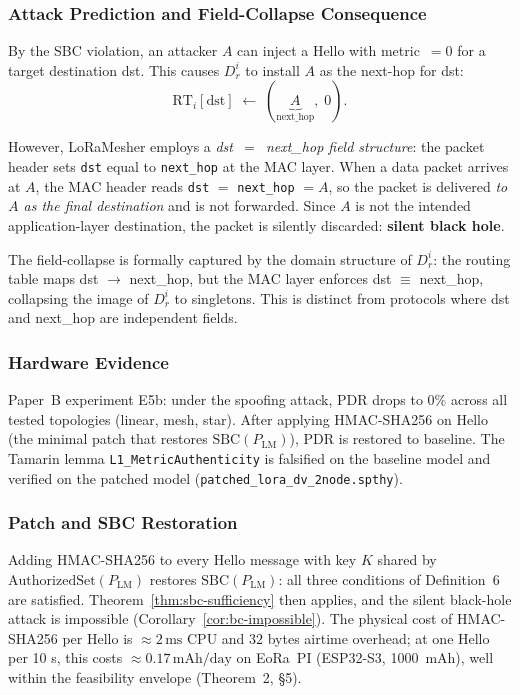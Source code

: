 \subsubsection*{Attack Prediction and Field-Collapse Consequence}

By the SBC violation, an attacker $A$ can inject a Hello with metric~$= 0$
for a target destination dst.
This causes $D_{r}^{i}$ to install $A$ as the next-hop for dst:
\[
  \mathrm{RT}_{i}[\mathrm{dst}] \;\gets\; (\underbrace{A}_{\mathrm{next\_hop}},\; 0).
\]

However, LoRaMesher employs a \emph{dst~$=$~next\_hop field structure}: the
packet header sets \texttt{dst} equal to \texttt{next\_hop} at the MAC layer.
When a data packet arrives at $A$, the MAC header reads
\texttt{dst} $=$ \texttt{next\_hop} $= A$, so the packet is delivered
\emph{to $A$ as the final destination} and is not forwarded.
Since $A$ is not the intended application-layer destination, the packet is
silently discarded: \textbf{silent black hole}.

The field-collapse is formally captured by the domain structure of $D_{r}^{i}$:
the routing table maps dst $\to$ next\_hop, but the MAC layer enforces
dst $\equiv$ next\_hop, collapsing the image of $D_{r}^{i}$ to singletons.
This is distinct from protocols where dst and next\_hop are independent fields.

\subsubsection*{Hardware Evidence}

Paper~B experiment E5b: under the spoofing attack, PDR drops to $0\%$ across
all tested topologies (linear, mesh, star).
After applying HMAC-SHA256 on Hello (the minimal patch that restores
$\mathrm{SBC}(P_{\mathrm{LM}})$), PDR is restored to baseline.
The Tamarin lemma \texttt{L1\_MetricAuthenticity} is falsified on the
baseline model and verified on the patched model (\texttt{patched\_lora\_dv\_2node.spthy}).

\subsubsection*{Patch and SBC Restoration}

Adding HMAC-SHA256 to every Hello message with key $K$ shared by
$\mathrm{AuthorizedSet}(P_{\mathrm{LM}})$ restores $\mathrm{SBC}(P_{\mathrm{LM}})$:
all three conditions of Definition~6 are satisfied.
Theorem~\ref{thm:sbc-sufficiency} then applies, and the silent black-hole
attack is impossible (Corollary~\ref{cor:bc-impossible}).
The physical cost of HMAC-SHA256 per Hello is ${\approx}2\,\mathrm{ms}$ CPU and
$32$ bytes airtime overhead; at one Hello per 10 s, this costs
${\approx}0.17\,\mathrm{mAh/day}$ on EoRa~PI (ESP32-S3, 1000~mAh), well within
the feasibility envelope (Theorem~2, §5).

